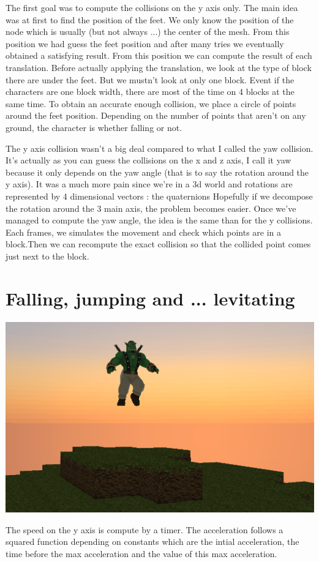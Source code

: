 \documentclass[article]{report}         %
\begin{document}
\bigskip\bigskip\bigskip\bigskip

The first goal was to compute the collisions on the y axis only. The main idea was at first to find the position of the feet. We only know the position of the node which is usually (but not always ...) the center of the mesh. From this position we had guess the feet position and after many tries we eventually obtained a satisfying result.
From this position we can compute the result of each translation. Before actually applying the translation, we look at the type of block there are under the feet. But we mustn't look at only one block. Event if the characters are one block width, there are most of the time on 4 blocks at the same time.
To obtain an accurate enough collision, we place a circle of points around the feet position. Depending on the number of points that aren't on any ground, the character is whether falling or not.\\
\bigskip

The y axis collision wasn't a big deal compared to what I called the yaw collision. It's actually as you can guess the collisions on the x and z axis, I call it yaw because it only depends on the yaw angle (that is to say the rotation around the y axis). It was a much more pain since we're in a 3d world and rotations are represented by 4 dimensional vectors : the quaternions Hopefully if we decompose the rotation around the 3 main axis, the problem becomes easier. Once we've managed to compute the yaw angle, the idea is the same than for the y collisions. Each frames, we simulates the movement and check which points are in a block.Then we can recompute the exact collision so that the collided point comes just next to the block.

      \section{Falling, jumping and ... levitating}
		\begin{center}
		  \includegraphics[width=14cm]{images/Physics/SinbadJump.png}
		\end{center}
	The speed on the y axis is compute by a timer. The acceleration follows a squared function depending on constants which are the intial acceleration, the time before the max acceleration and the value of this max acceleration.
\end{document}
